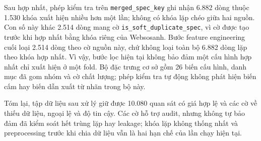 Sau hợp nhất, phép kiểm tra trên \texttt{merged\_spec\_key} ghi nhận 6.882 dòng thuộc 1.530 khóa xuất hiện nhiều hơn một lần; không có khóa lặp chéo giữa hai nguồn. Con số này khác 2.514 dòng mang cờ \texttt{is\_soft\_duplicate\_spec}, vì cờ được tạo trước khi hợp nhất bằng khóa riêng của Websosanh. Bước feature engineering cuối loại 2.514 dòng theo cờ nguồn này, chứ không loại toàn bộ 6.882 dòng lặp theo khóa hợp nhất. Vì vậy, bước lọc hiện tại không bảo đảm một cấu hình hợp nhất chỉ xuất hiện ở một fold. Bộ đặc trưng cơ sở gồm 26 biến cấu hình, danh mục đã gom nhóm và cờ chất lượng; phép kiểm tra tự động không phát hiện biến cấm hay biến dẫn xuất từ nhãn trong bộ này.

Tóm lại, tập dữ liệu sau xử lý giữ được 10.080 quan sát có giá hợp lệ và các cờ về thiếu dữ liệu, ngoại lệ và độ tin cậy. Các cờ hỗ trợ audit, nhưng không tự bảo đảm đã kiểm soát hết trùng lặp hay leakage; khóa lặp không thống nhất và preprocessing trước khi chia dữ liệu vẫn là hai hạn chế của lần chạy hiện tại.
